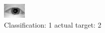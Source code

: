 \begin{figure}[h!]
\begin{center}
\includegraphics[width=0.60\columnwidth]{figures/ID962_class_1_target_2.png}
\end{center}
\caption{ Classification: 1 actual target: 2}
\label{fig:ID962_class_1_target_2}
\end{figure}
